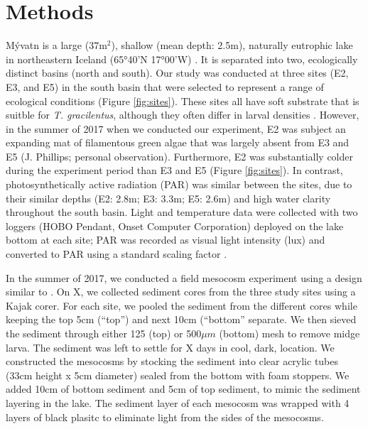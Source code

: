 

\section*{Methods}


M\'{y}vatn is a large ($37\text{m}^2$), shallow (mean depth: 2.5m), 
naturally eutrophic lake in northeastern Iceland (65°40’N 17°00’W) \citep{einarsson2004}.
It is separated into two, ecologically distinct basins (north and south).
Our study was conducted at three sites (E2, E3, and E5) in the south basin 
that were selected to represent a range of ecological conditions (Figure \ref{fig:sites}).
These sites all have soft substrate that is suitble for \emph{T. gracilentus},
although they often differ in larval densities \citep{lindegaard1979}. 
However, in the summer of 2017 when we conducted our experiment, 
E2 was subject an expanding mat of filamentous green algae 
that was largely absent from E3 and E5 (J. Phillips; personal observation).
Furthermore, E2 was substantially colder during the experiment period than 
E3 and E5 (Figure \ref{fig:sites}).
In contrast, photosynthetically active radiation (PAR) was similar between the sites,
due to their similar depths (E2: 2.8m; E3: 3.3m; E5: 2.6m)
and high water clarity throughout the south basin.
Light and temperature data were collected with two loggers 
(HOBO Pendant, Onset Computer Corporation) deployed on the lake bottom at each site; 
PAR was recorded as visual light intensity (lux)
and converted to PAR using a standard scaling factor \citep{thimijan1983}.

In the summer of 2017, we conducted a field mesocosm experiment using a design
similar to \citep{phillips2019}.
On X, we collected sediment cores from the three study sites using a Kajak corer. 
For each site, we pooled the sediment from the different cores while keeping the 
top 5cm (``top'') and next 10cm (``bottom'' separate.
We then sieved the sediment through either 125 (top) or 500$\mu m$ (bottom) mesh
to remove midge larva.
The sediment was left to settle for X days in cool, dark, location.
We constructed the mesocosms by stocking the sediment into 
clear acrylic tubes (33cm height x 5cm diameter) 
sealed from the bottom with foam stoppers.
We added 10cm of bottom sediment and 5cm of top sediment, 
to mimic the sediment layering in the lake.
The sediment layer of each mesocosm was wrapped with 4 layers of black plasitc
to eliminate light from the sides of the mesocosms.

